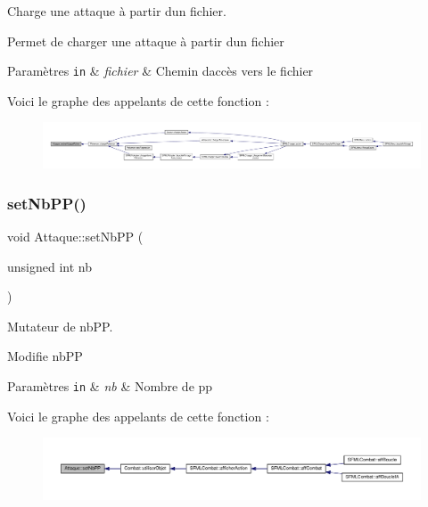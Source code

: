 Charge une attaque à partir d\textquotesingle{}un fichier. 

Permet de charger une attaque à partir d\textquotesingle{}un fichier 
\begin{DoxyParams}[1]{Paramètres}
\mbox{\tt in}  & {\em fichier} & Chemin d\textquotesingle{}accès vers le fichier \\
\hline
\end{DoxyParams}
Voici le graphe des appelants de cette fonction \+:\nopagebreak
\begin{figure}[H]
\begin{center}
\leavevmode
\includegraphics[width=350pt]{class_attaque_ac6a1ff465a27d926b72807354e6587eb_icgraph}
\end{center}
\end{figure}
\mbox{\label{class_attaque_a6e0b308dd1d9ddab688378e2630cb597}} 
\subsubsection{\texorpdfstring{set\+Nb\+P\+P()}{setNbPP()}}
{\footnotesize\ttfamily void Attaque\+::set\+Nb\+PP (\begin{DoxyParamCaption}\item[{unsigned int}]{nb }\end{DoxyParamCaption})}



Mutateur de nb\+PP. 

Modifie nb\+PP 
\begin{DoxyParams}[1]{Paramètres}
\mbox{\tt in}  & {\em nb} & Nombre de pp \\
\hline
\end{DoxyParams}
Voici le graphe des appelants de cette fonction \+:\nopagebreak
\begin{figure}[H]
\begin{center}
\leavevmode
\includegraphics[width=350pt]{class_attaque_a6e0b308dd1d9ddab688378e2630cb597_icgraph}
\end{center}
\end{figure}
\mbox{\label{class_attaque_a15bcb3d5d9add6357427cfb399e5584a}} 
